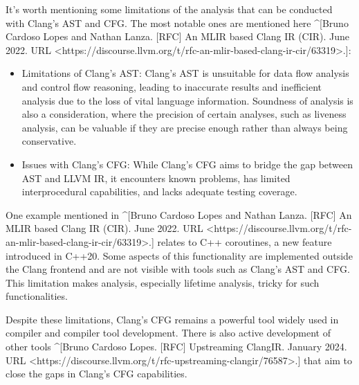 \begin{markdown}
It’s worth mentioning some limitations of the analysis that can be conducted with Clang’s AST and CFG. The most notable ones are mentioned here ^[Bruno Cardoso Lopes and Nathan Lanza. [RFC] An MLIR based Clang IR (CIR). June 2022. URL <https://discourse.llvm.org/t/rfc-an-mlir-based-clang-ir-cir/63319>.]:
\end{markdown}

\begin{itemize}
\item
Limitations of Clang’s AST: Clang’s AST is unsuitable for data flow analysis and control flow reasoning, leading to inaccurate results and inefficient analysis due to the loss of vital language information. Soundness of analysis is also a consideration, where the precision of certain analyses, such as liveness analysis, can be valuable if they are precise enough rather than always being conservative.

\item
Issues with Clang’s CFG: While Clang’s CFG aims to bridge the gap between AST and LLVM IR, it encounters known problems, has limited interprocedural capabilities, and lacks adequate testing coverage.
\end{itemize}

\begin{markdown}
One example mentioned in ^[Bruno Cardoso Lopes and Nathan Lanza. [RFC] An MLIR based Clang IR (CIR). June 2022. URL <https://discourse.llvm.org/t/rfc-an-mlir-based-clang-ir-cir/63319>.] relates to C++ coroutines, a new feature introduced in C++20. Some aspects of this functionality are implemented outside the Clang frontend and are not visible with tools such as Clang’s AST and CFG. This limitation makes analysis, especially lifetime analysis, tricky for such functionalities.

Despite these limitations, Clang’s CFG remains a powerful tool widely used in compiler and compiler tool development. There is also active development of other tools ^[Bruno Cardoso Lopes. [RFC] Upstreaming ClangIR. January 2024. URL <https://discourse.llvm.org/t/rfc-upstreaming-clangir/76587>.] that aim to close the gaps in Clang’s CFG capabilities.
\end{markdown}